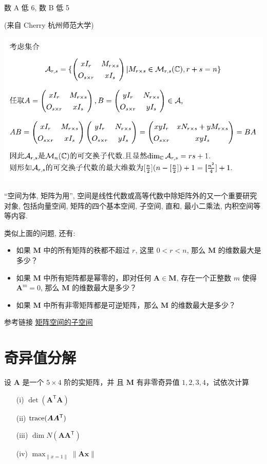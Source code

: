 \documentclass[a4paper, 12pt, UTF8]{ctexart}
\begin{document}
{\color{GoogleGreen} 数 A 低 6, 数 B 低 5

}

(来自 Cherry 杭州师范大学)

{\centering
  \includegraphics[width = .9\textwidth]{images/solution1.pdf}
  
}

\vspace{4em}

\begin{thm}{}{}{\adkaiti
    ``空间为体, 矩阵为用'', 空间是线性代数或高等代数中除矩阵外的又一个重要研究对象, 包括向量空间, 矩阵的四个基本空间, 子空间, 直和, 最小二乘法, 内积空间等等内容.

    类似上面的问题, 还有:
    \begin{itemize}
        \item 如果 $\boldsymbol{M}$ 中的所有矩阵的秩都不超过 $r$, 这里 $0<r<n$, 那么 $\boldsymbol{M}$ 的维数最大是多少？
        \item 如果 $\boldsymbol{M}$ 中所有矩阵都是幂零的，即对任何 $\boldsymbol{A} \in \boldsymbol{M}$, 存在一个正整数 $m$ 使得 $\boldsymbol{A}^{m}=0$, 那么 $\boldsymbol{M}$ 的维数最大是多少？
        \item 如果 $\boldsymbol{M}$ 中所有非零矩阵都是可逆矩阵，那么 $\boldsymbol{M}$ 的维数最大是多少？
    \end{itemize}

    参考链接 \href{http://pywonderland.com/subspace-of-matrices/}{矩阵空间的子空间}}
\end{thm}

\clearpage
\section{奇异值分解}
\begin{exa}
    设 $\boldsymbol{A}$ 是一个 $5 \times 4$ 阶的实矩阵，并
    且 $\boldsymbol{M}$ 有非零奇异值 $1, 2, 3, 4$，试依次计算
    \begin{enumerate}
        \item[(i)] $\det(\boldsymbol{A}^{\mathsf{T}}\boldsymbol{A})$
        \item[(ii)]
        ${\rm trace}(\boldsymbol{A}\boldsymbol{A}^{\mathsf{T}})$
        \item[(iii)]
        $\dim N(\boldsymbol{A}\boldsymbol{A}^{\mathsf{T}})$
        \item[(iv)]
        $\max_{\lVert x=1 \rVert}\lVert \boldsymbol{A}\bm{x}\rVert$
    \end{enumerate}
\end{exa}
\end{document}
